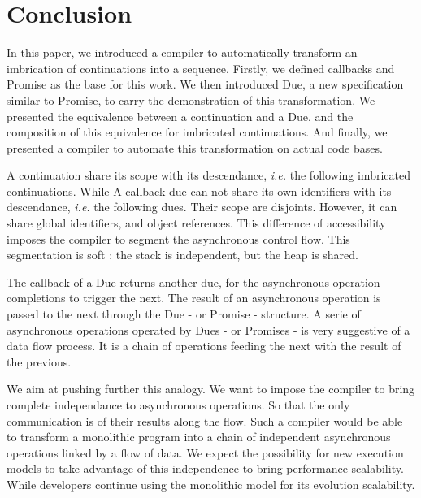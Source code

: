 \section{Conclusion} \label{section:conclusion}

In this paper, we introduced a compiler to automatically transform an imbrication of continuations into a sequence.
Firstly, we defined callbacks and Promise as the base for this work.
We then introduced Due, a new specification similar to Promise, to carry the demonstration of this transformation.
We presented the equivalence between a continuation and a Due, and the composition of this equivalence for imbricated continuations.
And finally, we presented a compiler to automate this transformation on actual code bases.

A continuation share its scope with its descendance, \textit{i.e.} the following imbricated continuations.
While A callback due can not share its own identifiers with its descendance, \textit{i.e.} the following dues.
Their scope are disjoints.
However, it can share global identifiers, and object references.
This difference of accessibility imposes the compiler to segment the asynchronous control flow.
This segmentation is soft : the stack is independent, but the heap is shared.

The callback of a Due returns another due, for the asynchronous operation completions to trigger the next.
The result of an asynchronous operation is passed to the next through the Due - or Promise - structure.
A serie of asynchronous operations operated by Dues - or Promises - is very suggestive of a data flow process.
It is a chain of operations feeding the next with the result of the previous.

We aim at pushing further this analogy.
We want to impose the compiler to bring complete independance to asynchronous operations.
So that the only communication is of their results along the flow.
Such a compiler would be able to transform a monolithic program into a chain of independent asynchronous operations linked by a flow of data.
We expect the possibility for new execution models to take advantage of this independence to bring performance scalability.
While developers continue using the monolithic model for its evolution scalability.